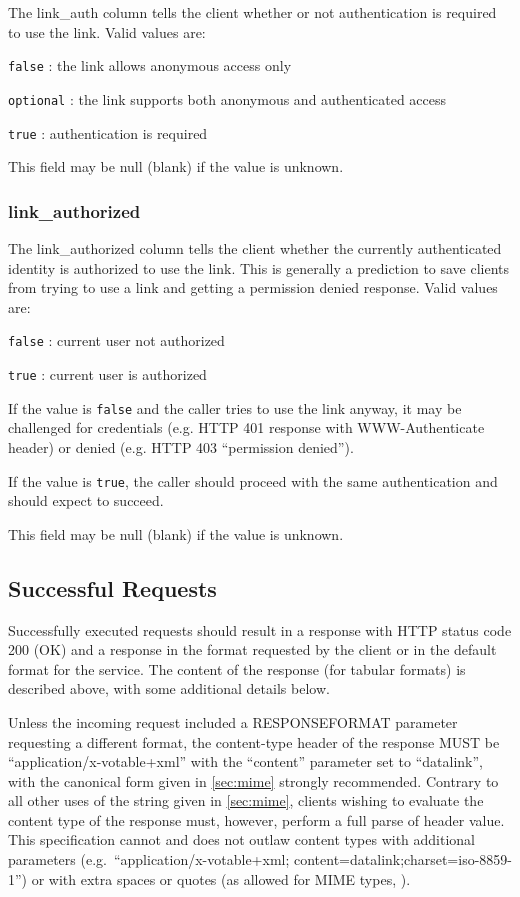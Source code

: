 \documentclass[11pt,a4paper]{ivoa}
\begin{document}
The link\_auth column tells the client whether or not authentication is required 
to use the link. Valid values are:

\verb|false| : the link allows anonymous access only

\verb|optional| : the link supports both anonymous and authenticated access

\verb|true| : authentication is required

This field may be null (blank) if the value is unknown.

\subsubsection{link\_authorized}

The link\_authorized column tells the client whether the currently authenticated 
identity is authorized to use the link. This is generally a prediction to save 
clients from trying to use a link and getting a permission denied response. Valid 
values are:

\verb|false| : current user not authorized

\verb|true| : current user is authorized

If the value is \verb|false| and the caller tries to use the link anyway, it may be 
challenged for credentials (e.g. HTTP 401 response with WWW-Authenticate header) or 
denied (e.g. HTTP 403 ``permission denied'').

If the value is \verb|true|, the caller should proceed with the same authentication
and should expect to succeed.

This field may be null (blank) if the value is unknown.

\subsection{Successful Requests}
\label{sec:successfulRequests}

Successfully executed requests should result in a response with HTTP
status code 200 (OK) and a response in the format requested by the client
or in the default format for the service. The content of the response
(for tabular formats) is described above,
with some additional details below.

Unless the incoming request included a RESPONSEFORMAT parameter requesting
a different format, the content-type header of the response MUST be
``application/x-votable+xml'' with the
``content'' parameter set to ``datalink'',
with the canonical form given in \ref{sec:mime}
strongly recommended. Contrary to
all other uses of the string given in \ref{sec:mime},
clients wishing to evaluate
the content type of the response must, however, perform a full parse
of header value. This specification cannot and does not outlaw content
types with additional parameters
(e.g.\ ``application/x-votable+xml; content=datalink;charset=iso-8859-1'')
or with extra spaces or quotes
(as allowed for MIME types, \citet{std:RFC2045}).
\end{document}
